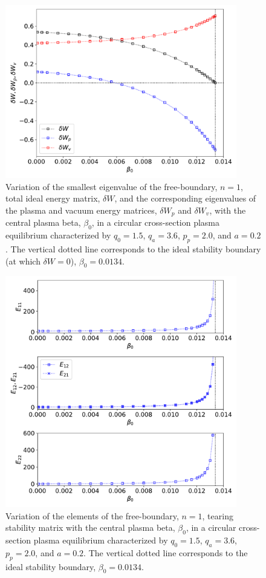 \documentclass[12pt,prb,aps]{revtex4-1}
\begin{document}
\begin{figure}
\centerline{\includegraphics[width=0.9\textwidth]{Fig5.pdf}}
\caption{Variation of the smallest eigenvalue of the free-boundary, $n=1$, total ideal energy matrix, $\delta W$, and the corresponding eigenvalues of the plasma and vacuum energy matrices, 
$\delta W_p$ and $\delta W_v$, with the central plasma beta, $\beta_0$, in a circular cross-section plasma equilibrium characterized by $q_0=1.5$, $q_a= 3.6$, $p_p=2.0$, and
$a=0.2$. The vertical dotted line corresponds to the ideal stability boundary (at which $\delta W=0$), $\beta_0=0.0134$.  \label{fig5}}
\end{figure}

\begin{figure}
\centerline{\includegraphics[width=0.9\textwidth]{Fig6.pdf}}
\caption{Variation of the elements of the free-boundary, $n=1$, tearing stability matrix with the central plasma beta, $\beta_0$, in a circular cross-section plasma equilibrium  characterized by $q_0=1.5$, $q_a= 3.6$, $p_p=2.0$, and
$a=0.2$. The vertical dotted line corresponds to the ideal stability boundary, $\beta_0=0.0134$. \label{fig6}}
\end{figure}
\end{document}
